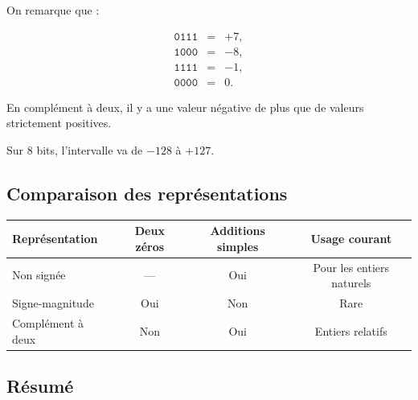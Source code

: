 \documentclass[11pt, a4paper]{book}
\begin{document}
On remarque que :

\[
\begin{array}{rcl}
\texttt{0111} &=& +7,\\
\texttt{1000} &=& -8,\\
\texttt{1111} &=& -1,\\
\texttt{0000} &=& 0.
\end{array}
\]

\begin{remarque}
En complément à deux, il y a une valeur négative de plus que de valeurs
strictement positives.

Sur 8 bits, l'intervalle va de $-128$ à $+127$.
\end{remarque}

\subsection{Comparaison des représentations}

\begin{center}
\renewcommand{\arraystretch}{1.3}
\begin{tabularx}{\textwidth}{lCCC}
\toprule
\textbf{Représentation}
&
\textbf{Deux zéros}
&
\textbf{Additions simples}
&
\textbf{Usage courant}
\\
\midrule
Non signée
&
---
&
Oui
&
Pour les entiers naturels
\\

Signe-magnitude
&
Oui
&
Non
&
Rare
\\

Complément à deux
&
Non
&
Oui
&
Entiers relatifs
\\
\bottomrule
\end{tabularx}
\end{center}

\subsection{Résumé}
\end{document}
